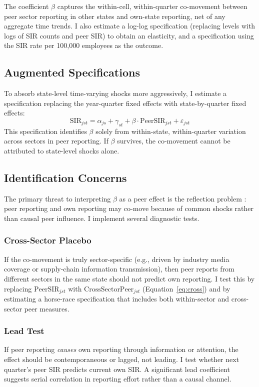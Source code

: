 \documentclass[12pt]{article}
\begin{document}
The coefficient $\beta$ captures the within-cell, within-quarter co-movement between peer sector reporting in other states and own-state reporting, net of any aggregate time trends. I also estimate a log-log specification (replacing levels with logs of SIR counts and peer SIR) to obtain an elasticity, and a specification using the SIR rate per 100,000 employees as the outcome.

\subsection{Augmented Specifications}

To absorb state-level time-varying shocks more aggressively, I estimate a specification replacing the year-quarter fixed effects with state-by-quarter fixed effects:
\begin{equation}
\text{SIR}_{jst} = \alpha_{js} + \gamma_{st} + \beta \cdot \text{PeerSIR}_{jst} + \varepsilon_{jst}
\label{eq:stateqtr}
\end{equation}
This specification identifies $\beta$ solely from within-state, within-quarter variation across sectors in peer reporting. If $\beta$ survives, the co-movement cannot be attributed to state-level shocks alone.

\subsection{Identification Concerns}

The primary threat to interpreting $\beta$ as a peer effect is the reflection problem \citep{manski1993identification}: peer reporting and own reporting may co-move because of common shocks rather than causal peer influence. I implement several diagnostic tests.

\subsubsection*{Cross-Sector Placebo} If the co-movement is truly sector-specific (e.g., driven by industry media coverage or supply-chain information transmission), then peer reports from different sectors in the same state should not predict own reporting. I test this by replacing $\text{PeerSIR}_{jst}$ with $\text{CrossSectorPeer}_{jst}$ (Equation~\ref{eq:cross}) and by estimating a horse-race specification that includes both within-sector and cross-sector peer measures.

\subsubsection*{Lead Test} If peer reporting \textit{causes} own reporting through information or attention, the effect should be contemporaneous or lagged, not leading. I test whether next quarter's peer SIR predicts current own SIR. A significant lead coefficient suggests serial correlation in reporting effort rather than a causal channel.
\end{document}
